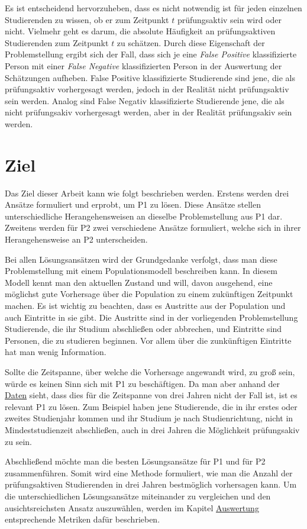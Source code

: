 Es ist entscheidend hervorzuheben, dass es nicht notwendig ist f\"ur jeden einzelnen Studierenden zu wissen, ob er
zum Zeitpunkt $t$  pr\"ufungsaktiv sein wird oder nicht. Vielmehr geht es darum, die absolute H\"aufigkeit an pr\"ufungsaktiven
Studierenden zum Zeitpunkt $t$ zu sch\"atzen. Durch diese Eigenschaft der Problemstellung ergibt sich der Fall,
dass sich je eine \textit{False Positive} klassifizierte Person mit einer
\textit{False Negative} klassifizierten Person in der Auswertung der Sch\"atzungen aufheben. False Positive klassifizierte Studierende sind jene, die
als pr\"ufungsaktiv vorhergesagt werden, jedoch in der Realit\"at nicht pr\"ufungsaktiv sein werden. Analog sind False Negativ klassifizierte Studierende jene, die
als nicht pr\"ufungsakiv  vorhergesagt werden, aber in der Realit\"at pr\"ufungsakiv sein werden.



\section{Ziel}
Das Ziel dieser Arbeit kann wie folgt beschrieben werden. Erstens werden drei Ans\"atze formuliert und erprobt,
um P1 zu l\"osen. Diese Ans\"atze stellen unterschiedliche Herangehensweisen an dieselbe Problemstellung aus P1 dar.
Zweitens werden f\"ur P2 zwei verschiedene Ans\"atze formuliert, welche sich in ihrer Herangehensweise an P2 unterscheiden.


Bei allen L\"osungsans\"atzen wird der Grundgedanke verfolgt, dass man diese Problemstellung mit einem Populationsmodell beschreiben kann.
In diesem Modell kennt man den aktuellen Zustand und will, davon ausgehend, eine m\"oglichst gute Vorhersage \"uber die Population zu einem zuk\"unftigen
Zeitpunkt machen. Es ist wichtig zu beachten, dass es Austritte aus der Population und auch Eintritte in sie gibt. Die Austritte sind in der vorliegenden Problemstellung
Studierende, die ihr Studium abschlie{\ss}en oder abbrechen, und Eintritte sind Personen, die zu studieren beginnen. Vor allem \"uber die zunk\"unftigen Eintritte
hat man wenig Information.

Sollte die Zeitspanne, \"uber welche die Vorhersage angewandt wird, zu gro{\ss} sein, w\"urde es keinen Sinn sich mit P1 zu besch\"aftigen.
Da man aber anhand der \hyperref[sec:daten]{Daten} sieht, dass dies f\"ur
die Zeitspanne von drei Jahren nicht der Fall ist, ist es relevant P1 zu l\"osen. Zum Beispiel haben jene Studierende, die in ihr erstes oder zweites Studienjahr kommen und ihr Studium je nach Studienrichtung,
nicht in Mindeststudienzeit abschlie{\ss}en, auch in drei Jahren die M\"oglichkeit pr\"ufungsakiv zu sein.

Abschlie{\ss}end m\"ochte man die besten L\"osungsans\"atze f\"ur P1 und f\"ur P2 zusammenf\"uhren. Somit wird eine Methode formuliert, wie man
die Anzahl der pr\"ufungsaktiven Studierenden in drei Jahren bestm\"oglich vorhersagen kann. Um die unterschiedlichen L\"osungsans\"atze miteinander
zu vergleichen und den ausichtsreichsten Ansatz auszuw\"ahlen, werden im Kapitel \hyperref[sec:auswertung]{Auswertung} entsprechende Metriken daf\"ur beschrieben.